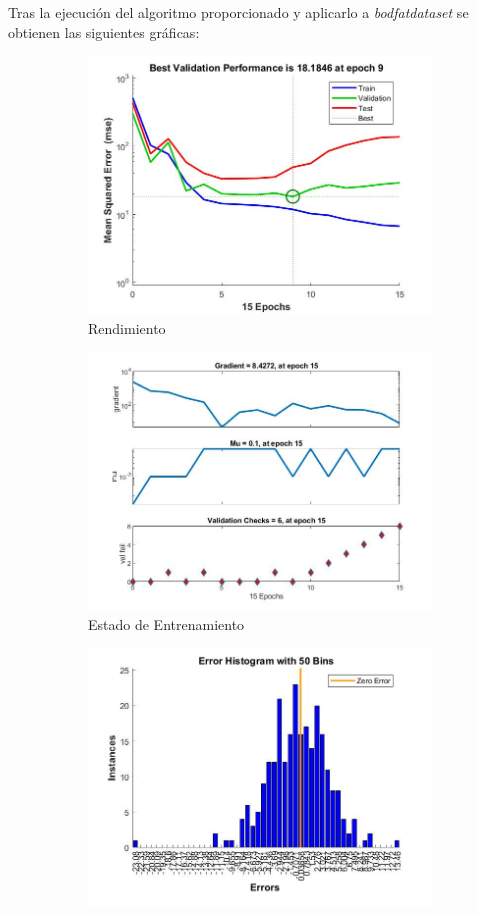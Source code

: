 \documentclass{article}
\begin{document}
Tras la ejecución del algoritmo proporcionado y aplicarlo a
\textit{bodfat\textunderscore dataset} se obtienen las siguientes gráficas: 


\begin{figure}[H]
 \centering
 \begin{subfigure}{0.4\textwidth}
  \includegraphics[width=0.8\linewidth]{../images/I_ex3_performance_bodyfat_dataset.jpg}
  \caption{Rendimiento}
 \end{subfigure}
 \begin{subfigure}{0.4\textwidth}
  \includegraphics[width=0.8\linewidth]{../images/I_ex3_trainingstate_bodyfat_dataset.jpg}
  \caption{Estado de Entrenamiento}
 \end{subfigure}
 \begin{subfigure}{0.4\textwidth}
  \includegraphics[width=0.8\linewidth]{../images/I_ex3_errorhistogram_bodyfat_dataset.jpg}

\end{subfigure}
\end{figure}
\end{document}
